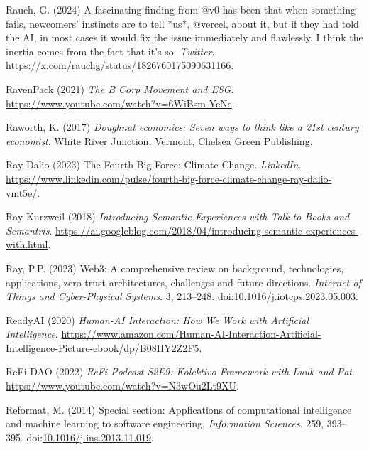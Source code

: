 \documentclass[
  letterpaper,
  DIV=11,
  numbers=noendperiod]{scrartcl}
\newlength{\cslhangindent}
\newenvironment{CSLReferences}[2] %
 {\begin{list}{}{%
  \setlength{\itemindent}{0pt}
  \setlength{\leftmargin}{0pt}
  \setlength{\parsep}{0pt}
  \ifodd #1
   \setlength{\leftmargin}{\cslhangindent}
   \setlength{\itemindent}{-1\cslhangindent}
  \fi
  \setlength{\itemsep}{#2\baselineskip}}}
 {\end{list}}
\begin{document}
\begin{CSLReferences}{0}{1}
Rauch, G. (2024) A fascinating finding from @v0 has been that when
something fails, newcomers' instincts are to tell *us*, @vercel, about
it, but if they had told the {AI}, in most cases it would fix the issue
immediately and flawlessly. {I} think the inertia comes from the fact
that it's so. \emph{Twitter}.
\url{https://x.com/rauchg/status/1826760175090631166}.

RavenPack (2021) \emph{The {B Corp Movement} and {ESG}}.
\url{https://www.youtube.com/watch?v=6WiBsm-YcNc}.

Raworth, K. (2017) \emph{Doughnut economics: Seven ways to think like a
21st century economist}. White River Junction, Vermont, Chelsea Green
Publishing.

Ray Dalio (2023) The {Fourth Big Force}: {Climate Change}.
\emph{LinkedIn}.
\url{https://www.linkedin.com/pulse/fourth-big-force-climate-change-ray-dalio-vmt5e/}.

Ray Kurzweil (2018) \emph{Introducing {Semantic Experiences} with {Talk}
to {Books} and {Semantris}}.
\url{https://ai.googleblog.com/2018/04/introducing-semantic-experiences-with.html}.

Ray, P.P. (2023) Web3: {A} comprehensive review on background,
technologies, applications, zero-trust architectures, challenges and
future directions. \emph{Internet of Things and Cyber-Physical Systems}.
3, 213--248.
doi:\href{https://doi.org/10.1016/j.iotcps.2023.05.003}{10.1016/j.iotcps.2023.05.003}.

ReadyAI (2020) \emph{Human-{AI Interaction}: {How We Work} with
{Artificial Intelligence}}.
\url{https://www.amazon.com/Human-AI-Interaction-Artificial-Intelligence-Picture-ebook/dp/B08HY2Z2F5}.

ReFi DAO (2022) \emph{{ReFi Podcast S2E9}: {Kolektivo Framework} with
{Luuk} and {Pat}}. \url{https://www.youtube.com/watch?v=N3wOu2Lt9XU}.

Reformat, M. (2014) Special section: {Applications} of computational
intelligence and machine learning to software engineering.
\emph{Information Sciences}. 259, 393--395.
doi:\href{https://doi.org/10.1016/j.ins.2013.11.019}{10.1016/j.ins.2013.11.019}.


\end{CSLReferences}
\end{document}
